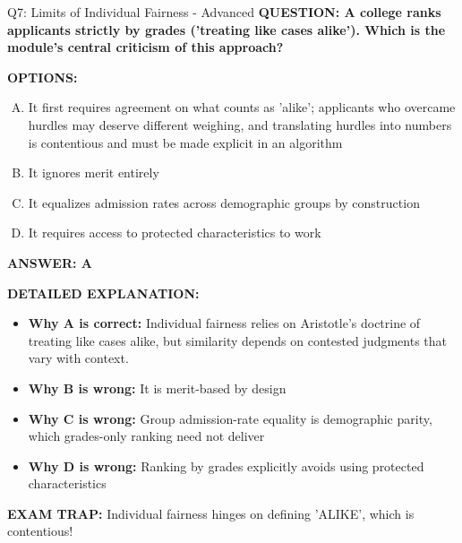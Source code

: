 \documentclass[8pt]{beamer}
\begin{document}
\begin{frame}[shrink=6]{Q7: Limits of Individual Fairness - Advanced}
\fontsize{6.5}{7.5}\selectfont
\textbf{QUESTION: A college ranks applicants strictly by grades ('treating like cases alike'). Which is the module's central criticism of this approach?}

\vspace{0.1cm}
\textbf{OPTIONS:}
\begin{enumerate}[A.]
\item It first requires agreement on what counts as 'alike'; applicants who overcame hurdles may deserve different weighing, and translating hurdles into numbers is contentious and must be made explicit in an algorithm
\item It ignores merit entirely
\item It equalizes admission rates across demographic groups by construction
\item It requires access to protected characteristics to work
\end{enumerate}

\vspace{0.1cm}
\textcolor{myblue}{\textbf{ANSWER: A}}

\vspace{0.1cm}
\textbf{DETAILED EXPLANATION:}
\begin{itemize}
\item \textbf{Why A is correct:} Individual fairness relies on Aristotle's doctrine of treating like cases alike, but similarity depends on contested judgments that vary with context.
\item \textbf{Why B is wrong:} It is merit-based by design
\item \textbf{Why C is wrong:} Group admission-rate equality is demographic parity, which grades-only ranking need not deliver
\item \textbf{Why D is wrong:} Ranking by grades explicitly avoids using protected characteristics
\end{itemize}

\textcolor{myred}{\textbf{EXAM TRAP:}} Individual fairness hinges on defining 'ALIKE', which is contentious!
\end{frame}
\end{document}

